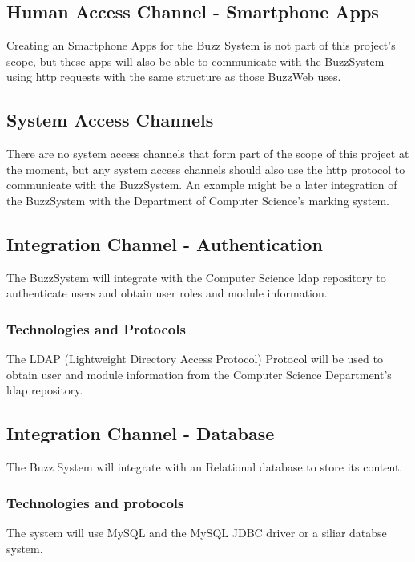 \subsection{Human Access Channel - Smartphone Apps}
Creating an Smartphone Apps for the Buzz System is not part of this project's scope, but these apps will also be able to communicate with the BuzzSystem using http requests with the same structure as those BuzzWeb uses.

\subsection{System Access Channels}
There are no system access channels that form part of the scope of this project at the moment, but any system access channels should also use the http protocol to communicate with the BuzzSystem. An example might be a later integration of the BuzzSystem with the Department of Computer Science's marking system.

\subsection{Integration Channel - Authentication}
The BuzzSystem will integrate with the Computer Science ldap repository to authenticate users and obtain user roles and module information. 

\subsubsection{Technologies and Protocols}
The LDAP (Lightweight Directory Access Protocol) Protocol will be used to obtain user and module information from the Computer Science Department's ldap repository. 

\subsection{Integration Channel - Database}
The Buzz System will integrate with an Relational database to store its content. 

\subsubsection{Technologies and protocols}
The system will use MySQL and  the MySQL JDBC driver or a siliar databse system.
